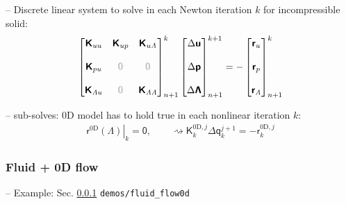 \documentclass[a4paper,12pt]{report}
\newcommand{\bs}[1]{\boldsymbol{#1}}
\newcommand{\zerom}{\textcolor{lightgray}{\bs{\mathsf{0}}}}
\newcommand{\ROP}{\bs{\mathsf{r}}}
\newcommand{\LMZ}{\bs{\mathsf{\Lambda}}}
\newcommand{\lmzi}{\mathit{\Lambda}} %
\begin{document}
-- Discrete linear system to solve in each Newton iteration $k$ for incompressible solid:
\begin{equation}
\label{equation-lin-sys-solid-inc-0d}
\begin{aligned}
\begin{bmatrix} \boldsymbol{\mathsf{K}}_{uu} & \boldsymbol{\mathsf{K}}_{up} & \boldsymbol{\mathsf{K}}_{u\lmzi} \\ \\ \boldsymbol{\mathsf{K}}_{pu} & \zerom & \zerom \\ \\  \boldsymbol{\mathsf{K}}_{\lmzi u} & \zerom & \boldsymbol{\mathsf{K}}_{\lmzi\lmzi}\end{bmatrix}_{n+1}^{k}\begin{bmatrix} \Delta\boldsymbol{\mathsf{u}} \\ \\ \Delta\boldsymbol{\mathsf{p}} \\ \\ \Delta\LMZ \end{bmatrix}_{n+1}^{k+1}=-\begin{bmatrix} \ROP_{u} \\ \\ \ROP_{p} \\ \\ \ROP_{\lmzi}\end{bmatrix}_{n+1}^{k}
\end{aligned}
\end{equation}

-- sub-solves: 0D model has to hold true in each nonlinear iteration $k$:
\begin{equation}
\label{equation-nonlin-lin-sys-0d}
\begin{aligned}
\left.\boldsymbol{\mathsf{r}}^{0\mathrm{D}}(\boldsymbol{\mathsf{\Lambda}})\right|_{k} = \boldsymbol{\mathsf{0}}, \qquad \rightsquigarrow \boldsymbol{\mathsf{K}}_{k}^{0\mathrm{D},j}\Delta\boldsymbol{\mathsf{q}}_{k}^{j+1} = -\boldsymbol{\mathsf{r}}_{k}^{0\mathrm{D},j}
\end{aligned}
\end{equation}

\subsubsection{Fluid + 0D flow}\label{fluid-0d-flow}

-- Example: Sec. \ref{fluid-0d-flow} \verb"demos/fluid_flow0d"\\
\end{document}
